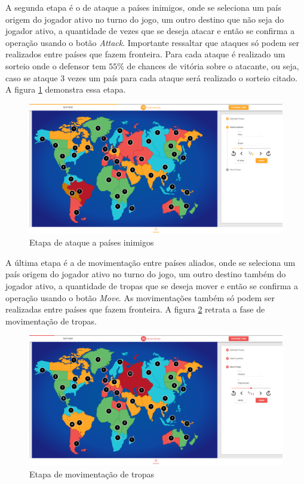\documentclass[rel_mlp]{iiufrgs}
\begin{document}
A segunda etapa é o de ataque a países inimigos, onde se seleciona um país origem do jogador ativo no turno do jogo, um outro destino que não seja do jogador ativo, a quantidade de vezes que se deseja atacar e então se confirma a operação usando o botão \textit{Attack}. Importante ressaltar que ataques só podem ser realizados entre países que fazem fronteira. 
Para cada ataque é realizado um sorteio onde o defensor tem $55\%$ de chances de vitória sobre o atacante, ou seja, caso se ataque 3 vezes um país para cada ataque será realizado o sorteio citado.
A figura \ref{fig:attack} demonstra essa etapa.

\begin{figure}[h!]
\centering
  \includegraphics[width=1.0\textwidth]{images/attack.png}
  \caption{Etapa de ataque a países inimigos}
  \label{fig:attack}
\end{figure}

A última etapa é a de movimentação entre países aliados, onde se seleciona um país origem do jogador ativo no turno do jogo, um outro destino também do jogador ativo, a quantidade de tropas que se deseja mover e então se confirma a operação usando o botão \textit{Move}. 
As movimentações também só podem ser realizadas entre países que fazem fronteira.
A figura \ref{fig:move} retrata a fase de movimentação de tropas.

\begin{figure}[h!]
\centering
  \includegraphics[width=1.0\textwidth]{images/move.png}
  \caption{Etapa de movimentação de tropas}
  \label{fig:move}
\end{figure}
\end{document}
